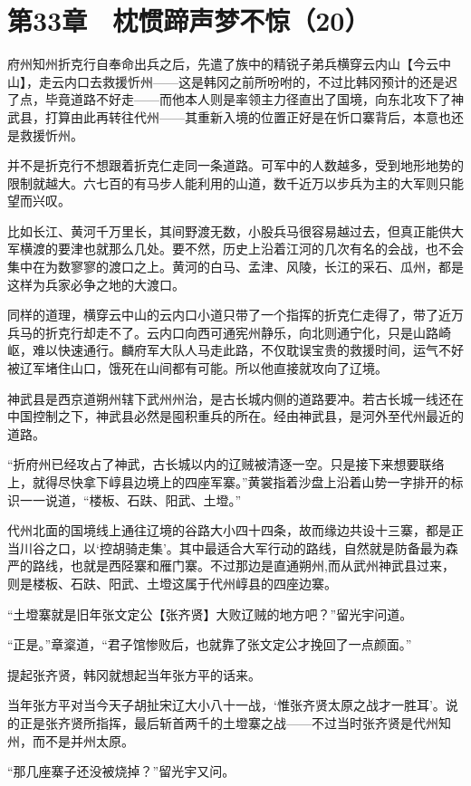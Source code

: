\section{第33章　枕惯蹄声梦不惊（20）}

府州知州折克行自奉命出兵之后，先遣了族中的精锐子弟兵横穿云内山【今云中山】，走云内口去救援忻州——这是韩冈之前所吩咐的，不过比韩冈预计的还是迟了点，毕竟道路不好走——而他本人则是率领主力径直出了国境，向东北攻下了神武县，打算由此再转往代州——其重新入境的位置正好是在忻口寨背后，本意也还是救援忻州。

并不是折克行不想跟着折克仁走同一条道路。可军中的人数越多，受到地形地势的限制就越大。六七百的有马步人能利用的山道，数千近万以步兵为主的大军则只能望而兴叹。

比如长江、黄河千万里长，其间野渡无数，小股兵马很容易越过去，但真正能供大军横渡的要津也就那么几处。要不然，历史上沿着江河的几次有名的会战，也不会集中在为数寥寥的渡口之上。黄河的白马、孟津、风陵，长江的采石、瓜州，都是这样为兵家必争之地的大渡口。

同样的道理，横穿云中山的云内口小道只带了一个指挥的折克仁走得了，带了近万兵马的折克行却走不了。云内口向西可通宪州静乐，向北则通宁化，只是山路崎岖，难以快速通行。麟府军大队人马走此路，不仅耽误宝贵的救援时间，运气不好被辽军堵住山口，饿死在山间都有可能。所以他直接就攻向了辽境。

神武县是西京道朔州辖下武州州治，是古长城内侧的道路要冲。若古长城一线还在中国控制之下，神武县必然是囤积重兵的所在。经由神武县，是河外至代州最近的道路。

“折府州已经攻占了神武，古长城以内的辽贼被清逐一空。只是接下来想要联络上，就得尽快拿下崞县边境上的四座军寨。”黄裳指着沙盘上沿着山势一字排开的标识一一说道，“楼板、石趺、阳武、土墱。”

代州北面的国境线上通往辽境的谷路大小四十四条，故而缘边共设十三寨，都是正当川谷之口，以‘控胡骑走集’。其中最适合大军行动的路线，自然就是防备最为森严的路线，也就是西陉寨和雁门寨。不过那边是直通朔州,而从武州神武县过来，则是楼板、石趺、阳武、土墱这属于代州崞县的四座边寨。

“土墱寨就是旧年张文定公【张齐贤】大败辽贼的地方吧？”留光宇问道。

“正是。”章楶道，“君子馆惨败后，也就靠了张文定公才挽回了一点颜面。”

提起张齐贤，韩冈就想起当年张方平的话来。

当年张方平对当今天子胡扯宋辽大小八十一战，‘惟张齐贤太原之战才一胜耳’。说的正是张齐贤所指挥，最后斩首两千的土墱寨之战——不过当时张齐贤是代州知州，而不是并州太原。

“那几座寨子还没被烧掉？”留光宇又问。

